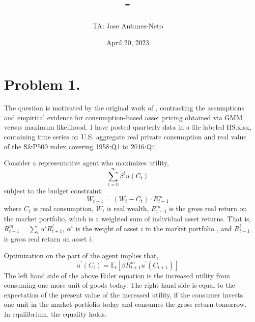 \documentclass[12pt,twoside]{article}
\title{\course-\assignment}
\author{TA: Jose Antunes-Neto}
\date{April 20, 2023}
\begin{document}
\nocite{*}
\maketitle

\section{Problem 1.}
The question is motivated by the original work of \citeauthor{hansen1982generalized}, contrasting the assumptions and empirical evidence for consumption-based asset pricing obtained via GMM versus maximum likelihood. I have posted quarterly data in a ﬁle labeled HS.xlsx, containing time series on U.S. aggregate real private consumption and real value of the S\&P500 index covering 1958:Q1 to 2016:Q4.

Consider a representative agent who maximizes utility,
\[
    \sum_{t=0}^\infty \beta^t u(C_t)
\]
subject to the budget constraint:
\[
    W_{t+1}=(W_t-C_t) \cdot R_{t+1}^m
\]
where \(C_t\) is real consumption, \(W_t\) is real wealth, \(R_{t+1}^m\) is the gross real return on the market portfolio, which is a weighted sum of individual asset returns. That is, \(R_{t+1}^m = \sum_i \alpha^iR_{t+1}^i\), \(\alpha^i\) is the weight of asset \(i\) in the market portfolio , and \(R_{t+1}^i\) is gross real return on asset \(i\).

Optimization on the part of the agent implies that,
\[
    u^\prime(C_t) = \mathbb{E}_t\left[\beta R_{t+1}^m u^\prime(C_{t+1})\right]
\]
The left hand side of the above Euler equation is the increased utility from consuming one more unit of goods today. The right hand side is equal to the expectation of the present value of the increased utility, if the consumer invests one unit in the market portfolio today and consumes the gross return tomorrow. In equilibrium, the equality holds.
\end{document}
